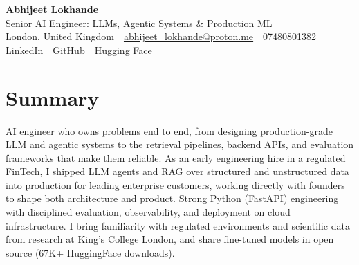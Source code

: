 \documentclass[10pt,a4paper]{article}
\newcommand{\sep}{\,\textcolor{accent!60}{\textbar}\,}
\begin{document}
\begin{center}
  {\fontsize{24}{26}\selectfont\bfseries Abhijeet Lokhande}\\[3pt]
  {\color{accent}\large Senior AI Engineer: LLMs, Agentic Systems \& Production ML}\\[5pt]
  {\small
    London, United Kingdom \sep
    \href{mailto:abhijeet_lokhande@proton.me}{abhijeet\_lokhande@proton.me} \sep
    07480801382 \\[2pt]
    \href{https://www.linkedin.com/in/ablds/}{LinkedIn} \sep
    \href{https://github.com/abhijeetscode}{GitHub} \sep
    \href{https://huggingface.co/ab-ai}{Hugging Face}
  }
\end{center}
\vspace{2pt}

\section{Summary}
AI engineer who owns problems end to end, from designing production-grade LLM and agentic systems to the retrieval pipelines, backend APIs, and evaluation frameworks that make them reliable. As an early engineering hire in a regulated FinTech, I shipped LLM agents and RAG over structured and unstructured data into production for leading enterprise customers, working directly with founders to shape both architecture and product. Strong Python (FastAPI) engineering with disciplined evaluation, observability, and deployment on cloud infrastructure. I bring familiarity with regulated environments and scientific data from research at King's College London, and share fine-tuned models in open source (67K+ HuggingFace downloads).

\end{document}
